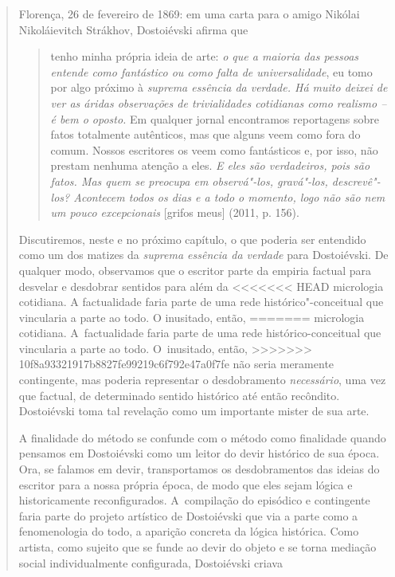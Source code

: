 {\begin{quote}
Florença, 26 de fevereiro de 1869: em uma carta para o amigo Nikólai
Nikoláievitch Strákhov, Dostoiévski afirma que

\begin{quote}
tenho minha própria ideia de arte: \emph{o que a maioria das pessoas
entende como fantástico ou como falta de universalidade}, eu tomo por
algo próximo à \emph{suprema essência da verdade. Há muito deixei de ver
as áridas observações de trivialidades cotidianas como realismo -- é bem
o oposto.} Em qualquer jornal encontramos reportagens sobre fatos
totalmente autênticos, mas que alguns veem como fora do comum. Nossos
escritores os veem como fantásticos e, por isso, não prestam nenhuma
atenção a eles. \emph{E eles são verdadeiros, pois são fatos. Mas quem
se preocupa em observá"-los, gravá"-los, descrevê"-los? Acontecem todos os
dias e a todo o momento, logo não são nem um pouco excepcionais}
{[}grifos meus{]} (2011, p. 156).
\end{quote}

Discutiremos, neste e no próximo capítulo, o que poderia ser entendido
como um dos matizes da \emph{suprema essência da verdade} para
Dostoiévski. De qualquer modo, observamos que o escritor parte da
empiria factual para desvelar e desdobrar sentidos para além da
<<<<<<< HEAD
micrologia cotidiana. A factualidade faria parte de uma rede
histórico"-conceitual que vincularia a parte ao todo. O inusitado, então,
=======
micrologia cotidiana. A~factualidade faria parte de uma rede
histórico-conceitual que vincularia a parte ao todo. O~inusitado, então,
>>>>>>> 10f8a93321917b8827fe99219c6f792e47a0f7fe
não seria meramente contingente, mas poderia representar o desdobramento
\emph{necessário}, uma vez que factual, de determinado sentido histórico
até então recôndito. Dostoiévski toma tal revelação como um importante
mister de sua arte.

A finalidade do método se confunde com o método como finalidade quando
pensamos em Dostoiévski como um leitor do devir histórico de sua época.
Ora, se falamos em devir, transportamos os desdobramentos das ideias do
escritor para a nossa própria época, de modo que eles sejam lógica e
historicamente reconfigurados. A~compilação do episódico e contingente
faria parte do projeto artístico de Dostoiévski que via a parte como a
fenomenologia do todo, a aparição concreta da lógica histórica. Como
artista, como sujeito que se funde ao devir do objeto e se torna
mediação social individualmente configurada, Dostoiévski criava


\end{quote}}

